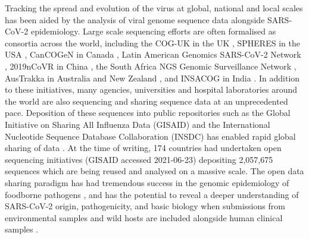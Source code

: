 Tracking the spread and evolution of the virus at global, national and local scales has been aided by the analysis of viral genome sequence data alongside SARS-CoV-2 epidemiology. Large scale sequencing efforts are often formalised as consortia across the world, including the COG-UK in the UK \cite{covid-19_genomics_uk_cog-uk_consortiumcontactcogconsortiumuk_integrated_2020}, SPHERES in the USA \cite{cdc_cases_2020}, CanCOGeN in Canada \cite{cancogen_genome_canada_cancogen_nodate}, Latin American Genomics SARS-CoV-2 Network \cite{pan_american_health_organization_laboratory_nodate, candido_evolution_2020}, 2019nCoVR in China \cite{zhao_2019_2020}, the South Africa NGS Genomic Surveillance Network \cite{network_for_genomic_surveillance_south_africa_ngs-sa_nodate}, AusTrakka in Australia and New Zealand \cite{communicable_diseases_genomics_network_austrakka_nodate}, and INSACOG in India \cite{government_of_india_indian_nodate}. In addition to these initiatives, many agencies, universities and hospital laboratories around the world are also sequencing and sharing sequence data at an unprecedented pace. Deposition of these sequences into public repositories such as the Global Initiative on Sharing All Influenza Data (GISAID) and the International Nucleotide Sequence Database Collaboration (INSDC) has enabled rapid global sharing of data \cite{shu_gisaid_2017,karsch-mizrachi_international_2018}. At the time of writing, 174 countries had undertaken open sequencing initiatives (GISAID accessed 2021-06-23) depositing 2,057,675 sequences which are being reused and analysed on a massive scale. The open data sharing paradigm has had tremendous success in the genomic epidemiology of foodborne pathogens \cite{allard_practical_2016,kubota_pulsenet_2019}, and has the potential to reveal a deeper understanding of SARS-CoV-2 origin, pathogenicity, and basic biology when submissions from environmental samples and wild hosts are included alongside human clinical samples \cite{cook_integrating_2020}.

